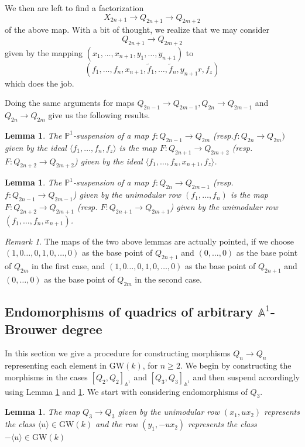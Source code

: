 \documentclass[11pt,leqno]{article}
\newcommand{\A}{{\mathbb A}}
\newcommand{\pone}{{\mathbb P}^1}
\renewcommand{\1}{{\rm 1\hspace*{-0.4ex}%
\rule{0.1ex}{1.52ex}\hspace*{0.2ex}}}
\newcommand{\<}[1]{{\langle}#1 {\rangle}}
\theoremstyle{plain}
\newtheorem{lem}[thm]{Lemma}
\theoremstyle{definition}
\theoremstyle{remark}
\newtheorem{rem}[thm]{Remark}
\numberwithin{equation}{section}
\begin{document}
We then are left to find a factorization 
\[
X_{2n+1}\to Q_{2n+1}\to Q_{2m+2}
\]
of the above map. With a bit of thought, we realize that we may consider 
\[
Q_{2n+1}\to Q_{2m+2}
\]
given by the mapping $(x_1,\ldots, x_{n+1}, y_1, \ldots, y_{n+1})$ to 
\[
(f_1, \ldots, f_n, x_{n+1},\tilde{f}_1, \ldots,\tilde f_n, y_{n+1}r,  f_z)
\]
which does the job.

Doing the same arguments for maps $Q_{2n-1}\to Q_{2m-1}, Q_{2n}\to Q_{2m-1}$ and $Q_{2n}\to Q_{2m}$ give us the following results.

\begin{lem}
\label{lem:ponesuspoddeven}
The $\pone$-suspension of a map $f:Q_{2n-1}\to Q_{2m}$ (resp.$f:Q_{2n}\to Q_{2m})$  given by the ideal $\langle f_1, \ldots, f_n, f_z \rangle $ is the map $F:Q_{2n+1}\to Q_{2m+2}$ (resp. $F:Q_{2n+2}\to Q_{2m+2}$) given by the ideal $\langle f_1, \ldots, f_n, x_{n+1},f_z \rangle$.
\end{lem}


\begin{lem}
\label{lem:ponesuspevenodd}
The $\pone$-suspension of a map $f:Q_{2n}\to Q_{2m-1}$ (resp. $f:Q_{2n-1}\to Q_{2m-1}$) given by the unimodular row $(f_1, \ldots, f_n)$ is the map $F:Q_{2n+2}\to Q_{2m+1}$ (resp. $F:Q_{2n+1}\to Q_{2m+1}$) given by the unimodular row $(f_1, \ldots, f_n, x_{n+1})$.
\end{lem}

\begin{rem}
The maps of the two above lemmas are actually pointed, if we choose $(1,0\ldots,0,1,0,\ldots,0)$ as the base point of $Q_{2n+1}$ and $(0,\ldots,0)$ as the base point of $Q_{2m}$ in the first case, and $(1,0\ldots,0,1,0,\ldots,0)$ as the base point of $Q_{2n+1}$ and $(0,\ldots,0)$ as the base point of $Q_{2m}$ in the second case.
\end{rem}
\subsection{Endomorphisms of quadrics of arbitrary $\A^1$-Brouwer degree}
In this section we give a procedure for constructing morphisms $Q_n \to Q_n$ representing each element in $\mathrm{GW}(k)$, for $n\geq 2$. We begin by constructing the morphisms in the cases $[Q_2,Q_2]_{\A^1}$ and $[Q_3,Q_3]_{\A^1}$ and then suspend accordingly using Lemma \ref{lem:ponesuspevenodd} and \ref{lem:ponesuspoddeven}. We start with considering endomorphisms of $Q_3$. 
\begin{lem}
    The map $Q_3 \to Q_3$ given by the unimodular row $(x_1, ux_2)$ represents the class $\langle u \rangle \in \mathrm{GW}(k)$ and the row $(y_1, -ux_2)$ represents the class $-\langle u \rangle \in \mathrm{GW}(k)$
\end{lem}
\end{document}
